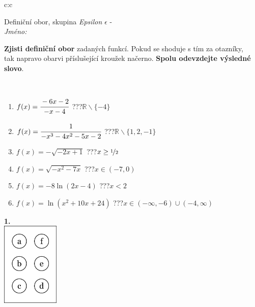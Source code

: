 \documentclass[10pt]{report}
\begin{document}
\begin{tabular}{c:c}
\begin{minipage}[c][104.5mm][t]{0.5\linewidth}
\begin{center}
\vspace{7mm}
{\huge Definiční obor, skupina \textit{Epsilon $\epsilon$} -}\\[5mm]
\textit{Jméno:}\phantom{xxxxxxxxxxxxxxxxxxxxxxxxxxxxxxxxxxxxxxxxxxxxxxxxxxxxxxxxxxxxxxxxx}\\[5mm]
\begin{minipage}{0.95\linewidth}
\begin{center}
\textbf{Zjisti definiční obor} zadaných funkcí. Pokud se shoduje s tím za otazníky,\\tak napravo obarvi příslušející kroužek načerno. \textbf{Spolu odevzdejte výsledné slovo}.
\end{center}
\end{minipage}
\\[1mm]
\begin{minipage}{0.79\linewidth}
\begin{center}
\begin{varwidth}{\linewidth}
\begin{enumerate}
\normalsizerrr
\item $f(x)=\cfrac{-6x-2}{-x-4}$\quad \dotfill\; ???\;\dotfill \quad $\mathbb{R}\smallsetminus\{-4\}$
\item $f(x)=\cfrac{1}{-x^3-4x^2-5x-2}$\quad \dotfill\; ???\;\dotfill \quad $\mathbb{R}\smallsetminus\{1,2,-1\}$
\item $f(x)=-\sqrt{-2x+1}$\quad \dotfill\; ???\;\dotfill \quad $x\geq\nicefrac{1}{2}$
\item $f(x)=\sqrt{-x^2-7x}$\quad \dotfill\; ???\;\dotfill \quad $x\in(-7 , 0)$
\item $f(x)=-8\ln{(2x-4)}$\quad \dotfill\; ???\;\dotfill \quad $x<2$
\item $f(x)=\ln{(x^2+10x+24)}$\quad \dotfill\; ???\;\dotfill \quad $x\in(-\infty , -6)\cup(-4 , \infty)$
\end{enumerate}
\end{varwidth}
\end{center}
\end{minipage}
\begin{minipage}{0.20\linewidth}
\begin{center}
{\Huge\bfseries 1.} \\[2mm]
\includegraphics[height=40mm]{../images/braille.png}

\end{center}
\end{minipage}
\end{center}
\end{minipage}
\end{tabular}
\end{document}
